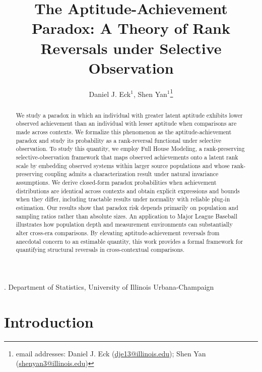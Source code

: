 \documentclass[12pt]{article}
\title{The Aptitude-Achievement Paradox: A Theory of Rank Reversals under Selective Observation}
\author{Daniel J. Eck$^1$, Shen Yan$^1$\thanks{email addresses: Daniel J. Eck (\url{dje13@illinois.edu});  Shen Yan (\url{shenyan3@illinois.edu})}}
\date{}
\begin{document}
\maketitle

{. Department of Statistics, University of Illinois Urbana-Champaign \\}

\newpage
\begin{abstract}
We study a paradox in which an individual with greater latent aptitude exhibits lower observed achievement than an individual with lesser aptitude when comparisons are made across contexts. We formalize this phenomenon as the aptitude-achievement paradox and study its probability as a rank-reversal functional under selective observation. To study this quantity, we employ Full House Modeling, a rank-preserving selective-observation framework that maps observed achievements onto a latent rank scale by embedding observed systems within larger source populations and whose rank-preserving coupling admits a characterization result under natural invariance assumptions. We derive closed-form paradox probabilities when achievement distributions are identical across contexts and obtain explicit expressions and bounds when they differ, including tractable results under normality with reliable plug-in estimation. Our results show that paradox risk depends primarily on population and sampling ratios rather than absolute sizes.  An application to Major League Baseball illustrates how population depth and measurement environments can substantially alter cross-era comparisons. By elevating aptitude-achievement reversals from anecdotal concern to an estimable quantity, this work provides a formal framework for quantifying structural reversals in cross-contextual comparisons.
\end{abstract}



\section{Introduction}
\end{document}
